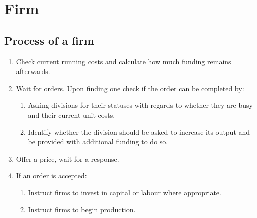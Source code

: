 \documentclass[11pt]{article}
\begin{document}
\section{Firm}

\subsection{Process of a firm}
\begin{enumerate}
	\item Check current running costs and calculate how much funding remains afterwards.
	\item Wait for orders. Upon finding one check if the order can be completed by:
	\begin{enumerate}
		\item Asking divisions for their statuses with regards to whether they are busy and their current unit costs.
		\item Identify whether the division should be asked to increase its output and be provided with additional funding to do so.
	\end{enumerate}
	\item Offer a price, wait for a response.
	\item If an order is accepted:
	\begin{enumerate}
		\item Instruct firms to invest in capital or labour where appropriate.
		\item Instruct firms to begin production.
	\end{enumerate}
\end{enumerate}
\end{document}
